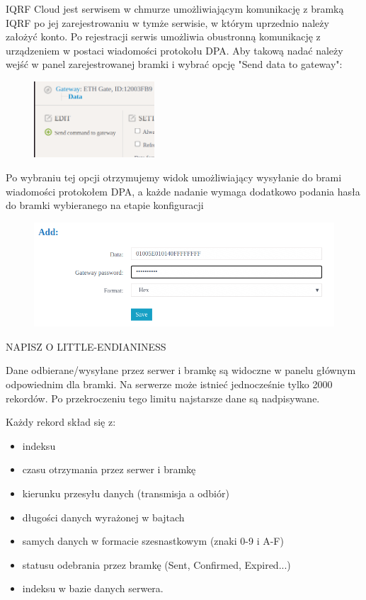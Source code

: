 \documentclass[a4paper, 12pt]{article}
\begin{document}
IQRF Cloud jest serwisem w chmurze umożliwiającym komunikację z bramką IQRF po jej zarejestrowaniu w tymże serwisie, w którym uprzednio należy
założyć konto. Po rejestracji serwis umożliwia obustronną komunikację z urządzeniem w postaci wiadomości protokołu DPA. Aby takową nadać należy 
wejść w panel zarejestrowanej bramki i wybrać opcję "Send data to gateway":


\begin{figure}[H]
    \centering
    \includegraphics[width=0.4\textwidth]{zdj/send-command-to-gw.png}
\end{figure}

Po wybraniu tej opcji otrzymujemy widok umożliwiający wysyłanie do brami wiadomości protokołem DPA, a każde nadanie wymaga dodatkowo podania
hasła do bramki wybieranego na etapie konfiguracji

\begin{figure}[H]
    \includegraphics[width=\textwidth]{zdj/cloud-send-message.png}
\end{figure}

NAPISZ O LITTLE-ENDIANINESS

Dane odbierane/wysyłane przez serwer i bramkę są widoczne w panelu głównym odpowiednim dla bramki. Na serwerze może istnieć jednocześnie tylko 2000
rekordów. Po przekroczeniu tego limitu najstarsze dane są nadpisywane.

Każdy rekord skład się z:
\begin{itemize}
    \item indeksu 
    \item czasu otrzymania przez serwer i bramkę
    \item kierunku przesyłu danych (transmisja a odbiór)
    \item długości danych wyrażonej w bajtach 
    \item samych danych w formacie szesnastkowym (znaki 0-9 i A-F)
    \item statusu odebrania przez bramkę (Sent, Confirmed, Expired...)
    \item indeksu w bazie danych serwera.
\end{itemize}
\end{document}
